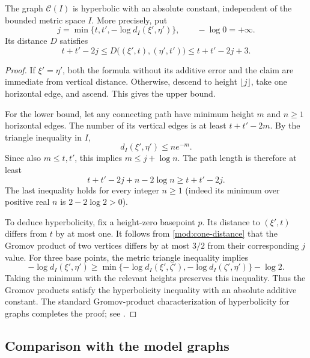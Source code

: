 \begin{lemma}\label{mod:cone}
The graph $\mathcal C(I)$ is hyperbolic with an absolute constant,
independent of the bounded metric space $I$.  More precisely, put
\[
 j=\min\{t,t',-\log d_I(\xi',\eta')\},
 \qquad -\log0=+\infty.
\]
Its distance $D$ satisfies
\begin{equation}\label{mod:cone-distance}
 t+t'-2j\le
 D\bigl((\xi',t),(\eta',t')\bigr)
 \le t+t'-2j+3.
\end{equation}
\end{lemma}
\begin{proof}
If $\xi'=\eta'$, both the formula without its additive error and
the claim are immediate from vertical distance.  Otherwise,
descend to height $\lfloor j\rfloor$, take one horizontal edge,
and ascend.  This gives the upper bound.

For the lower bound, let any connecting path have minimum height
$m$ and $n\ge1$ horizontal edges.  The number of its vertical
edges is at least $t+t'-2m$.  By the triangle inequality in $I$,
\[
 d_I(\xi',\eta')\le n e^{-m}.
\]
Since also $m\le t,t'$, this implies $m\le j+\log n$.
The path length is therefore at least
\[
 t+t'-2j+n-2\log n\ge t+t'-2j.
\]
The last inequality holds for every integer $n\ge1$ (indeed its
minimum over positive real $n$ is $2-2\log2>0$).

To deduce hyperbolicity, fix a height-zero basepoint $p$.
Its distance to $(\xi',t)$ differs from $t$ by at most one.
It follows from \eqref{mod:cone-distance} that the Gromov product
of two vertices differs by at most $3/2$ from their corresponding
$j$ value.  For three base points, the metric triangle inequality
implies
\[
 -\log d_I(\xi',\eta')
 \ge\min\{-\log d_I(\xi',\zeta'),
                -\log d_I(\zeta',\eta')\}-\log2.
\]
Taking the minimum with the relevant heights preserves this
inequality.  Thus the Gromov products satisfy the hyperbolicity
inequality with an absolute additive constant.  The standard
Gromov-product characterization of hyperbolicity for graphs
completes the proof; see \cite[Chapter~III.H]{BridsonHaefliger}.
\end{proof}

\subsection{Comparison with the model graphs}

